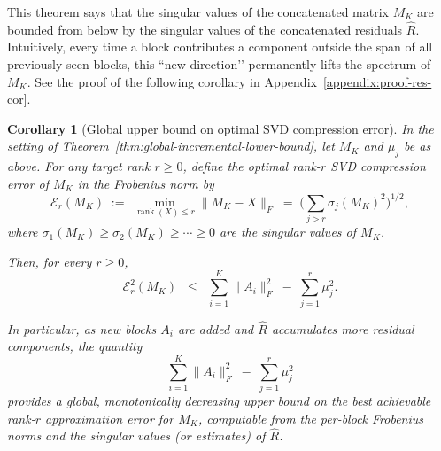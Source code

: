 \documentclass[10pt]{article} %
\def\eqref#1{equation~\ref{#1}}
\newtheorem{corollary}{Corollary}
\begin{document}
This theorem says that the singular values of the concatenated matrix $M_K$ are
bounded from below by the singular values of the concatenated residuals
$\widehat{R}$. Intuitively, every time a block contributes a component outside
the span of all previously seen blocks, this “new direction’’ permanently lifts
the spectrum of $M_K$. See the proof of the following corollary in Appendix~\ref{appendix:proof-res-cor}.

\begin{corollary}[Global upper bound on optimal SVD compression error]
\label{cor:residual-upper-error}
In the setting of Theorem~\ref{thm:global-incremental-lower-bound}, let
$M_K$ and $\mu_j$ be as above. For any target rank $r \ge 0$, define the
optimal rank-$r$ SVD compression error of $M_K$ in the Frobenius norm by
\[
  \mathcal{E}_r(M_K)
  \;:=\;
  \min_{\operatorname{rank}(X)\le r} \|M_K - X\|_F
  \;=\;
  \Bigg(\sum_{j>r} \sigma_j(M_K)^2\Bigg)^{1/2},
\]
where $\sigma_1(M_K)\ge\sigma_2(M_K)\ge\cdots\ge 0$ are the singular values
of $M_K$.

Then, for every $r \ge 0$,
\begin{equation}
\label{eq:residual-upper-error}
  \mathcal{E}_r^2(M_K)
  \;\;\le\;\;
  \sum_{i=1}^K \|A_i\|_F^2 \;-\; \sum_{j=1}^r \mu_j^2.
\end{equation}

In particular, as new blocks $A_i$ are added and $\widehat{R}$ accumulates
more residual components, the quantity
\[
  \sum_{i=1}^K \|A_i\|_F^2 \;-\; \sum_{j=1}^r \mu_j^2
\]
provides a global, monotonically \emph{decreasing} upper bound on the best
achievable rank-$r$ approximation error for $M_K$, computable from the per-block
Frobenius norms and the singular values (or estimates) of $\widehat{R}$.
\end{corollary}

\end{document}

